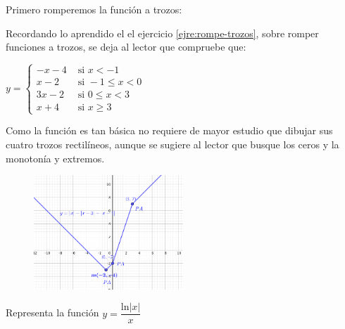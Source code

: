 \begin{proofw}\renewcommand{\qedsymbol}{$\diamond$}	
  
  Primero romperemos la función a trozos:
\begin{multicols}{2}
	
Recordando lo aprendido el el ejercicio \ref{ejre:rompe-trozos}, sobre romper funciones a trozos, se deja al lector que compruebe que:
	

$y=\begin{cases}
-x-4 & \mbox { si }	x<-1 \\
x-2 & \mbox { si }	-1\le x < 0 \\
3x-2 & \mbox { si } 0\le x < 3 \\
x+4 & \mbox { si } x \ge 3
\end{cases}$

Como la función es tan básica no requiere de mayor estudio que dibujar sus cuatro trozos rectilíneos, aunque se sugiere al lector que busque los ceros y la monotonía y extremos.

\begin{figure}[H]
		\centering
		\includegraphics[width=0.5\textwidth]{imagenes/imagenes05/T05IM36.png}
	\end{figure}
\end{multicols}

\end{proofw}

\begin{ejre} Representa la función $y=\dfrac {\mathrm{ln}|x|}{x}$
	
\end{ejre}

